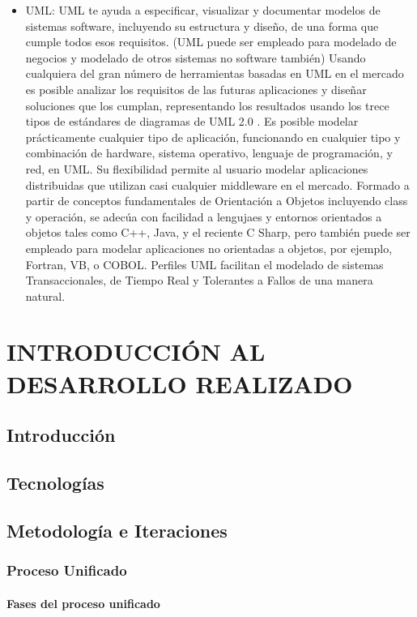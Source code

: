 \documentclass[12pt, a4paper, twoside]{book}
\begin{document}
\begin{itemize}
		\item UML:
		UML te ayuda a especificar, visualizar y documentar modelos de sistemas software, incluyendo su estructura y  diseño, de una forma que cumple todos esos requisitos. (UML puede ser empleado para modelado de negocios y modelado de otros sistemas no software también) Usando cualquiera del gran número de herramientas basadas en UML en el mercado es posible analizar los requisitos de las futuras aplicaciones y diseñar soluciones que los cumplan, representando los resultados usando los trece tipos de estándares de diagramas de UML 2.0 .
		Es posible modelar prácticamente cualquier tipo de aplicación, funcionando en cualquier tipo y combinación de hardware, sistema operativo, lenguaje de programación, y red, en UML. Su flexibilidad permite al usuario modelar aplicaciones distribuidas que utilizan casi cualquier middleware en el mercado. Formado a partir de conceptos fundamentales de Orientación a Objetos incluyendo class y operación, se adecúa con facilidad a lengujaes y entornos orientados a objetos tales como C++, Java, y el reciente C Sharp, pero también puede ser empleado para modelar aplicaciones no orientadas a objetos, por ejemplo, Fortran, VB, o COBOL. Perfiles UML facilitan el modelado de sistemas Transaccionales, de Tiempo Real y Tolerantes a Fallos de una manera natural.\cite{UML}
		
	\end{itemize} 
	\chapter{INTRODUCCIÓN AL DESARROLLO REALIZADO}
	\section{Introducción}
	\section{Tecnologías}
	\section{Metodología e Iteraciones}
	\subsection{Proceso Unificado}
	\subsubsection{Fases del proceso unificado}
\end{document}
